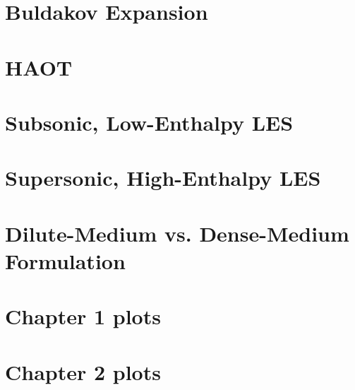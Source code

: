 \chapter{Buldakov Expansion}\label{app:buldakovExpansion}
    

\chapter{\acrfull{HAOT}\label{app:haotResults}}
    \label{app:haotAerodynamics}
    \label{app:haotOptics}
    \label{app:quantumMechanics}
    \label{app:constants}
    \label{app:conversions}

\chapter{Subsonic, Low-Enthalpy \acrfull{LES}\label{app:lesSubsonicWavelength}}
    \label{app:subsonicLesWavelength633}
    \label{app:subsonicLesWavelength1000}

\chapter{Supersonic, High-Enthalpy \acrfull{LES}\label{app:lesSupersonicWavelength}}
    \label{app:supersonicLesWavelength633}
    \label{app:supersonicLesWavelength1000}

\chapter{Dilute-Medium vs. Dense-Medium Formulation\label{app:diluteDenseFormulation}}
    


\iffalse
\chapter{Chapter 1 plots}\label{app:chapter1}


\chapter{Chapter 2 plots}\label{app:chapter2}


